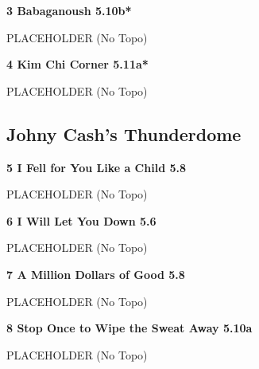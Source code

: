 \begin{multicols}{2}
\needspace{1.5cm}
\label{rt:Babaganoush}
\colorbox{RoyalBlue!20}{
\parbox{0.95\linewidth}{
\textbf{
3 Babaganoush 5.10b*  
}}}

\begin{adjustwidth}{0.5cm}{}			
PLACEHOLDER (No Topo)
\end{adjustwidth}



\needspace{1.5cm}
\label{rt:Kim Chi Corner}
\colorbox{RoyalBlue!20}{
\parbox{0.95\linewidth}{
\textbf{
4 Kim Chi Corner 5.11a*  
}}}

\begin{adjustwidth}{0.5cm}{}			
PLACEHOLDER (No Topo)
\end{adjustwidth}




\needspace{1.5cm}
\subsection*{Johny Cash's Thunderdome}\label{bf:Johny Cash's Thunderdome}
	


\needspace{1.5cm}
\label{rt:I Fell for You Like a Child}
\colorbox{green!20}{
\parbox{0.95\linewidth}{
\textbf{
5 I Fell for You Like a Child 5.8  
}}}

\begin{adjustwidth}{0.5cm}{}			
PLACEHOLDER (No Topo)
\end{adjustwidth}



\needspace{1.5cm}
\label{rt:I Will Let You Down}
\colorbox{green!20}{
\parbox{0.95\linewidth}{
\textbf{
6 I Will Let You Down 5.6  
}}}

\begin{adjustwidth}{0.5cm}{}			
PLACEHOLDER (No Topo)
\end{adjustwidth}



\needspace{1.5cm}
\label{rt:A Million Dollars of Good}
\colorbox{green!20}{
\parbox{0.95\linewidth}{
\textbf{
7 A Million Dollars of Good 5.8  
}}}

\begin{adjustwidth}{0.5cm}{}			
PLACEHOLDER (No Topo)
\end{adjustwidth}



\needspace{1.5cm}
\label{rt:Stop Once to Wipe the Sweat Away}
\colorbox{RoyalBlue!20}{
\parbox{0.95\linewidth}{
\textbf{
8 Stop Once to Wipe the Sweat Away 5.10a  
}}}

\begin{adjustwidth}{0.5cm}{}			
PLACEHOLDER (No Topo)
\end{adjustwidth}





\end{multicols}
\clearpage